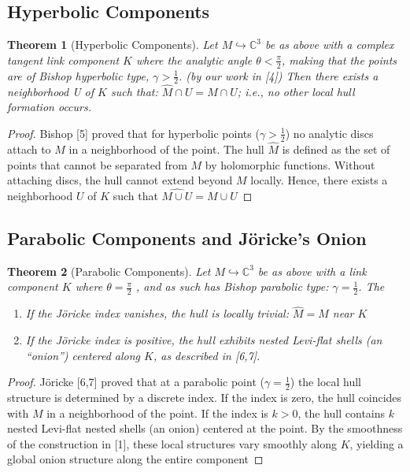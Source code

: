 \documentclass[10pt,a4paper]{amsart}
\newtheorem{theorem}{Theorem}
\begin{document}
\subsection{Hyperbolic Components}
\begin{theorem}[Hyperbolic Components]
Let $M \hookrightarrow \mathbb{C}^3$ be as above with a complex tangent link component $K$ where the analytic angle $\theta < \frac{\pi}{2}$, making that the points are of  Bishop hyperbolic type, $\gamma > \frac{1}{2}$. (by our work in [4])  Then there exists a neighborhood U of $K$ such that: $\hat{M} \cap U = M \cap U$; i.e., no other local hull formation occurs.\end{theorem}\begin{proof}Bishop [5] proved that for hyperbolic points ($\gamma > \frac{1}{2}$) no analytic discs attach to $M$ in a neighborhood of the point. The hull $\hat{M}$ is defined as the set of points that cannot be separated from $M$ by holomorphic functions. Without attaching discs, the hull cannot extend beyond $M$ locally. Hence, there exists a neighborhood $U$ of $K$ such that $\widehat{M \cup U} = M \cup U$

\end{proof}
\subsection{Parabolic Components and Jöricke's Onion}

\begin{theorem}
[Parabolic Components]Let $M \hookrightarrow \mathbb{C}^3$ be as above with a link component $K$ where $\theta = \frac{\pi}{2}$ , and as such has Bishop parabolic type: $\gamma = \frac{1}{2}$. The
\begin{enumerate}\item If the Jöricke index vanishes, the hull is locally trivial: $\hat{M} = M$ near $K$
\item If the Jöricke index is positive, the hull exhibits nested Levi-flat shells (an ``onion'') centered along $K$, as described in [6,7].
\end{enumerate}
\end{theorem}

\begin{proof}
Jöricke [6,7] proved that at a parabolic point ($\gamma = \frac{1}{2}$) the local hull structure is determined by a discrete index. If the index is zero, the hull coincides with $M$ in a neighborhood of the point. If the index is $k > 0$, the hull contains $k$ nested Levi-flat nested shells (an onion) centered at the point. By the smoothness of the construction in [1], these local structures vary smoothly along $K$, yielding a global onion structure along the entire component
\end{proof}
\end{document}
